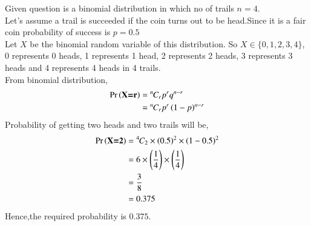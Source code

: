 Given question is a binomial distribution in which no of trails  $n= 4$.
\\Let's assume a trail is succeeded if the coin turns out to be head.Since it is a fair coin probability of success is $p=0.5$
\\Let $X$ be the binomial random variable of this distribution.
So $X \in \{0,1,2,3,4\}$, 0 represents 0 heads, 1 represents 1 head, 2 represents 2 heads, 3 represents 3 heads and 4 represents 4 heads in 4 trails.
\\From binomial distribution,
\begin{align}
\Pr\left(\textbf{X=r}\right)&={{}^{n}\mkern-1muC_{r}}p^{r}q^{n-r}
\\&={{}^{n}\mkern-1muC_{r}}p^{r}\left(1-p\right)^{n-r}
\end{align}
Probability of getting two heads and two trails will be,
\begin{align}
\Pr\left(\textbf{X=2}\right)&={{}^{4}\mkern-1muC_{2}}\times\left(0.5\right)^{2}\times\left(1-0.5\right)^{2}
   \\ &= 6\times\left(\frac{1}{4}\right)\times\left(\frac{1}{4}\right)
   \\ &=\frac{3}{8}
   \\ &=0.375
\end{align}
Hence,the required probability is $0.375$.
